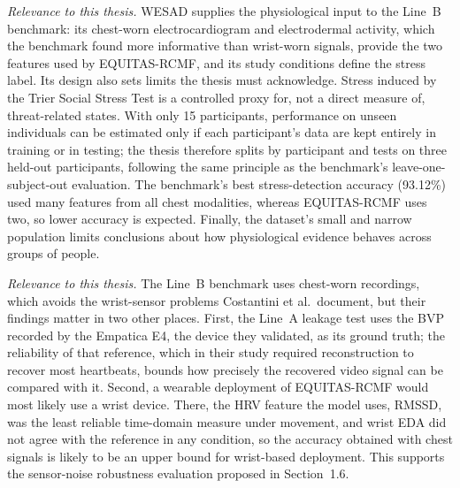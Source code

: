 

\textit{Relevance to this thesis.} WESAD supplies the physiological input to the Line~B benchmark: its chest-worn electrocardiogram and electrodermal activity, which the benchmark found more informative than wrist-worn signals, provide the two features used by EQUITAS-RCMF, and its study conditions define the stress label. Its design also sets limits the thesis must acknowledge. Stress induced by the Trier Social Stress Test is a controlled proxy for, not a direct measure of, threat-related states. With only 15 participants, performance on unseen individuals can be estimated only if each participant's data are kept entirely in training or in testing; the thesis therefore splits by participant and tests on three held-out participants, following the same principle as the benchmark's leave-one-subject-out evaluation. The benchmark's best stress-detection accuracy (93.12\%) used many features from all chest modalities, whereas EQUITAS-RCMF uses two, so lower accuracy is expected. Finally, the dataset's small and narrow population limits conclusions about how physiological evidence behaves across groups of people.


\textit{Relevance to this thesis.} The Line~B benchmark uses chest-worn recordings, which avoids the wrist-sensor problems Costantini et al.\ document, but their findings matter in two other places. First, the Line~A leakage test uses the BVP recorded by the Empatica E4, the device they validated, as its ground truth; the reliability of that reference, which in their study required reconstruction to recover most heartbeats, bounds how precisely the recovered video signal can be compared with it. Second, a wearable deployment of EQUITAS-RCMF would most likely use a wrist device. There, the HRV feature the model uses, RMSSD, was the least reliable time-domain measure under movement, and wrist EDA did not agree with the reference in any condition, so the accuracy obtained with chest signals is likely to be an upper bound for wrist-based deployment. This supports the sensor-noise robustness evaluation proposed in Section~1.6.


